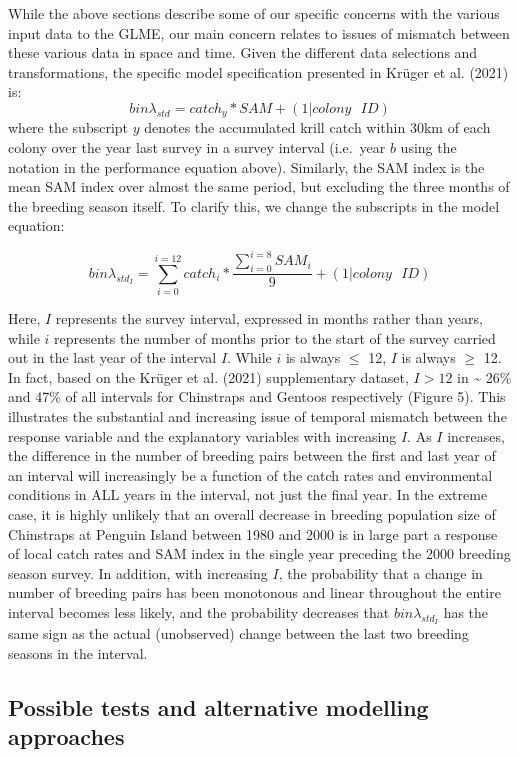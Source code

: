 \documentclass[]{elsarticle} %
\begin{document}
While the above sections describe some of our specific concerns with the
various input data to the GLME, our main concern relates to issues of
mismatch between these various data in space and time. Given the
different data selections and transformations, the specific model
specification presented in Krüger et al. (2021) is:
\[bin\lambda_{std}=catch_y*SAM+(1|colony\text{ }ID)\] where the
subscript \(y\) denotes the accumulated krill catch within 30km of each
colony over the year last survey in a survey interval (i.e.~year \(b\)
using the notation in the performance equation above). Similarly, the
SAM index is the mean SAM index over almost the same period, but
excluding the three months of the breeding season itself. To clarify
this, we change the subscripts in the model equation:

\[bin\lambda_{std_I}=\sum_{i=0}^{i=12}{catch_i}*\frac{\sum_{i=0}^{i=8}{SAM_i}}{9}+(1|colony\text{ }ID)\]

Here, \(I\) represents the survey interval, expressed in months rather
than years, while \(i\) represents the number of months prior to the
start of the survey carried out in the last year of the interval \(I\).
While \(i\) is always \(\leqslant\) 12, \(I\) is always \(\geqslant\)
12. In fact, based on the Krüger et al. (2021) supplementary dataset,
\(I>12\) in \textasciitilde{} 26\% and 47\% of all intervals for
Chinstraps and Gentoos respectively (Figure 5). This illustrates the
substantial and increasing issue of temporal mismatch between the
response variable and the explanatory variables with increasing \(I\).
As \(I\) increases, the difference in the number of breeding pairs
between the first and last year of an interval will increasingly be a
function of the catch rates and environmental conditions in ALL years in
the interval, not just the final year. In the extreme case, it is highly
unlikely that an overall decrease in breeding population size of
Chinstraps at Penguin Island between 1980 and 2000 is in large part a
response of local catch rates and SAM index in the single year preceding
the 2000 breeding season survey. In addition, with increasing \(I\), the
probability that a change in number of breeding pairs has been
monotonous and linear throughout the entire interval becomes less
likely, and the probability decreases that \(bin\lambda_{std_I}\) has
the same sign as the actual (unobserved) change between the last two
breeding seasons in the interval.

\hypertarget{possible-tests-and-alternative-modelling-approaches}{%
\subsection{Possible tests and alternative modelling
approaches}\label{possible-tests-and-alternative-modelling-approaches}}
\end{document}
